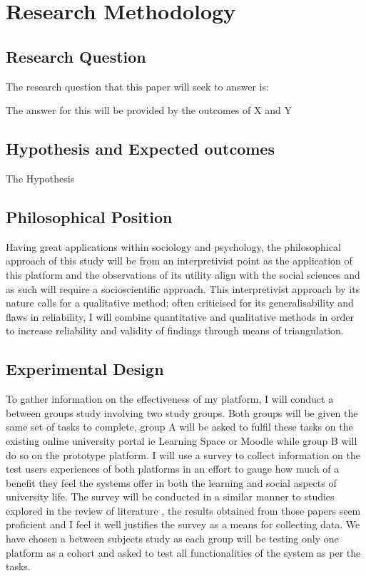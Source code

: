 \documentclass[lettersize,journal]{IEEEtran}
\begin{document}
\section{Research Methodology}
	\subsection{Research Question}
	The research question that this paper will seek to answer is:

	The answer for this will be provided by the outcomes of X and Y


	\subsection{Hypothesis and Expected outcomes}
	The Hypothesis

	\subsection{Philosophical Position}
	Having great applications within sociology and psychology, the philosophical approach of this study will be from an 
	interpretivist point as the application of this platform and the observations of its utility align with the social
	 sciences and as such will require a socioscientific approach. This interpretivist approach by its nature calls for a qualitative
	 method; often criticised for its generalisability and flaws in reliability, I will combine quantitative and qualitative methods
	 in order to increase reliability and validity of findings through means of triangulation.

    	\subsection{Experimental Design}
    	To gather information on the effectiveness of my platform, I will conduct a between groups study involving
    	two study groups. Both groups will be given the same set of tasks to complete, group A will be asked to fulfil 
    	these tasks on the existing online university portal ie Learning Space or Moodle while group B will
	do so on the prototype platform. I will use a survey to collect information on the test users experiences
    	of both platforms in an effort to gauge how much of a benefit they feel the systems offer in both the
    	learning and social aspects of university life. The survey will be conducted in a similar manner to
    	studies explored in the review of literature \cite{Liu2010}\cite{Baruah2012} \cite{Akram et al 2017}
    	\cite{Wang2011} \cite{Evans2014}, the results obtained from those papers seem proficient
    	and I feel it well justifies the survey as a means for collecting data. We have chosen a between subjects study
	as each group will be testing only one platform as a cohort and asked to test all functionalities of
    	the system as per the tasks.
\end{document}
